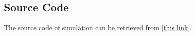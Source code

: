 \begin{appendices}
  \chapter{Source Code}
  The source code of simulation can be retrieved from \href{https://github.com/zhaolin820/ris-aided-fual-functional-radar-and-communications-beamforming-design}{[this link]}.
\end{appendices}